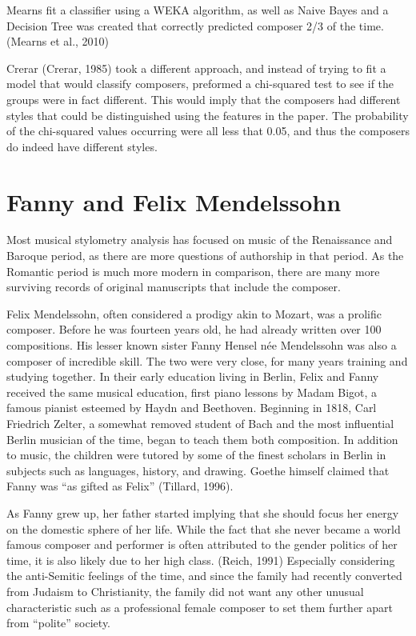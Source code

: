 \documentclass[12pt,twoside]{reedthesis}
\theoremstyle{definition}
\theoremstyle{definition}
\theoremstyle{definition}
\theoremstyle{remark}
\begin{document}
Mearns fit a classifier using a WEKA algorithm, as well as Naive Bayes
and a Decision Tree was created that correctly predicted composer 2/3 of
the time. (Mearns et al., 2010)

Crerar (Crerar, 1985) took a different approach, and instead of trying
to fit a model that would classify composers, preformed a chi-squared
test to see if the groups were in fact different. This would imply that
the composers had different styles that could be distinguished using the
features in the paper. The probability of the chi-squared values
occurring were all less that 0.05, and thus the composers do indeed have
different styles.

\section{Fanny and Felix Mendelssohn}\label{fanny-and-felix-mendelssohn}

Most musical stylometry analysis has focused on music of the Renaissance
and Baroque period, as there are more questions of authorship in that
period. As the Romantic period is much more modern in comparison, there
are many more surviving records of original manuscripts that include the
composer.

Felix Mendelssohn, often considered a prodigy akin to Mozart, was a
prolific composer. Before he was fourteen years old, he had already
written over 100 compositions. His lesser known sister Fanny Hensel née
Mendelssohn was also a composer of incredible skill. The two were very
close, for many years training and studying together. In their early
education living in Berlin, Felix and Fanny received the same musical
education, first piano lessons by Madam Bigot, a famous pianist esteemed
by Haydn and Beethoven. Beginning in 1818, Carl Friedrich Zelter, a
somewhat removed student of Bach and the most influential Berlin
musician of the time, began to teach them both composition. In addition
to music, the children were tutored by some of the finest scholars in
Berlin in subjects such as languages, history, and drawing. Goethe
himself claimed that Fanny was ``as gifted as Felix'' (Tillard, 1996).

As Fanny grew up, her father started implying that she should focus her
energy on the domestic sphere of her life. While the fact that she never
became a world famous composer and performer is often attributed to the
gender politics of her time, it is also likely due to her high class.
(Reich, 1991) Especially considering the anti-Semitic feelings of the
time, and since the family had recently converted from Judaism to
Christianity, the family did not want any other unusual characteristic
such as a professional female composer to set them further apart from
``polite'' society.
\end{document}
